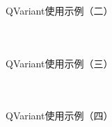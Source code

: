 \documentclass[UTF8,aspectratio=169]{beamer}
\begin{document}
\begin{frame}[fragile]{QVariant使用示例（二）}
    \begin{columns}
        \begin{column}{0.48\textwidth}
            \inputminted[firstline=31,lastline=46]{cpp}{code/qt_variant_example.cpp}
        \end{column}
        \begin{column}{0.48\textwidth}
            \inputminted[firstline=47,lastline=61]{cpp}{code/qt_variant_example.cpp}
        \end{column}
    \end{columns}
\end{frame}

\begin{frame}[fragile]{QVariant使用示例（三）}
    \begin{columns}
        \begin{column}{0.48\textwidth}
            \inputminted[firstline=62,lastline=79]{cpp}{code/qt_variant_example.cpp}
        \end{column}
        \begin{column}{0.48\textwidth}
            \inputminted[firstline=80,lastline=93]{cpp}{code/qt_variant_example.cpp}
        \end{column}
    \end{columns}
\end{frame}

\begin{frame}[fragile]{QVariant使用示例（四）}
    \begin{columns}
        \begin{column}{0.48\textwidth}
            \inputminted[firstline=94,lastline=113]{cpp}{code/qt_variant_example.cpp}
        \end{column}
        \begin{column}{0.48\textwidth}
            \inputminted[firstline=12,lastline=16]{cpp}{code/qt_variant_example.cpp}
        \end{column}
    \end{columns}
\end{frame}
\end{document}
